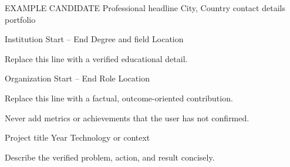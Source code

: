\documentclass[english]{cv}
\begin{document}
\cvheader
  {EXAMPLE CANDIDATE}
  {Professional headline}
  {City, Country \cvsep contact details \cvsep portfolio}


\cventry
  {Institution}
  {Start -- End}
  {Degree and field}
  {Location}

\begin{cvitems}
  \item Replace this line with a verified educational detail.
\end{cvitems}


\cventry
  {Organization}
  {Start -- End}
  {Role}
  {Location}

\begin{cvitems}
  \item Replace this line with a factual, outcome-oriented contribution.
  \item Never add metrics or achievements that the user has not confirmed.
\end{cvitems}


\cventry
  {Project title}
  {Year}
  {Technology or context}
  {}

\begin{cvitems}
  \item Describe the verified problem, action, and result concisely.
\end{cvitems}


\end{document}
